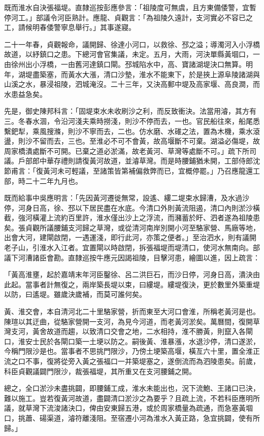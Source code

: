 既而淮水自決張福堤。直隸巡按彭應參言：「祖陵度可無虞，且方東備倭警，宜暫停河工。」部議令河臣熟計。應龍、貞觀言：「為祖陵久遠計，支河實必不容已之工，請候明春倭警寧息舉行。」其事遂寢。

二十一年春，貞觀報命，議開歸、徐達小河口，以救徐、邳之溢；導濁河入小浮橋故道，以紓鎮口之患。下總河會官集議，未定。五月，大雨，河決單縣黃堌口，一由徐州出小浮橋，一由舊河達鎮口閘。邳城陷水中，高、寶諸湖堤決口無算。明年，湖堤盡築塞，而黃水大漲，清口沙墊，淮水不能東下，於是挾上源阜陵諸湖與山溪之水，暴浸祖陵，泗城淹沒。二十三年，又決高郵中堤及高家堰、高良澗，而水患益急矣。

先是，御史陳邦科言：「固堤束水未收刷沙之利，而反致衝決。法當用濬，其方有三。冬春水涸，令沿河淺夫乘時撈淺，則沙不停而去，一也。官民船往來，船尾悉繫鈀犁，乘風搜滌，則沙不寧而去，二也。仿水磨、水碓之法，置為木機，乘水滾盪，則沙不留而去，三也。至淮必不可不會黃，故高堰斷不可棄。湖溢必傷堤，故周家橋潰處斷不可開。已棄之道必淤滿，故老黃河、草灣等處斷不可。」疏下所司議。戶部郎中華存禮則請復黃河故道，並濬草灣。而是時腰鋪猶未開，工部侍郎沈節甫言：「復黃河未可輕議，至諸策皆第補偏救弊而已，宜概停罷。」乃召應龍還工部，時二十二年九月也。

既而給事中吳應明言：「先因黃河遷徙無常，設遙、縷二堤束水歸漕，及水過沙停，河身日高，徐、邳以下居民盡在水底。今清口外則黃流阻遏，清口內則淤沙橫截，強河橫灌上流約百里許，淮水僅出沙上之浮流，而瀦蓄於盱、泗者遂為祖陵患矣。張貞觀所議腰鋪支河歸之草灣，或從清河南岸別開小河至駱家營、馬廠等地，出會大河，建閘啟閉，一遇運淺，即行此河，亦策之便者。」至治泗水，則有議開老子山，引淮水入江者。宜置閘以時啟閉，拆張福堤而堤清口，使河水無南向。部議下河漕諸臣會勘。直隸巡按牛應元因謁祖陵，目擊河患，繪圖以進，因上疏言：

「黃高淮壅，起於嘉靖末年河臣鑿徐、呂二洪巨石，而沙日停，河身日高，潰決由此起。當事者計無復之，兩岸築長堤以束，曰縷堤。縷堤復決，更於數里外築重堤以防，曰遙堤。雖歲決歲補，而莫可誰何矣。

黃、淮交會，本自清河北二十里駱家營，折而東至大河口會淮，所稱老黃河是也。陳瑄以其迂曲，從駱家營開一支河，為見今河道，而老黃河淤矣。萬曆間，復開草灣支河，黃舍故道而趨，以致清口交會之地，二水相持，淮不勝黃，則竄入各閘口，淮安士民於各閘口築一土埂以防之。嗣後黃、淮暴漲，水退沙停，清口遂淤，今稱門限沙是也。當事者不思挑門限沙，乃傍土埂築高堰，橫亙六十里，置全淮正流之口不事，復將從旁入黃之張福口一并築堤塞之，遂倒流而為泗陵患矣。前歲，科臣貞觀議闢門限沙，裁張福堤，其所重又在支河腰鋪之開。

總之，全口淤沙未盡挑闢，即腰鋪工成，淮水未能出也，況下流鮑、王諸口已決，難以施工。豈若復黃河故道，盡闢清口淤沙之為要乎？且疏上流，不若科臣應明所議，就草灣下流浚諸決口，俾由安東歸五港，或於周家橋量為疏通，而急塞黃堌口，挑蕭、碭渠道，濬符離淺阻。至宿遷小河為淮水入黃正路，急宜挑闢，使有所歸。」

